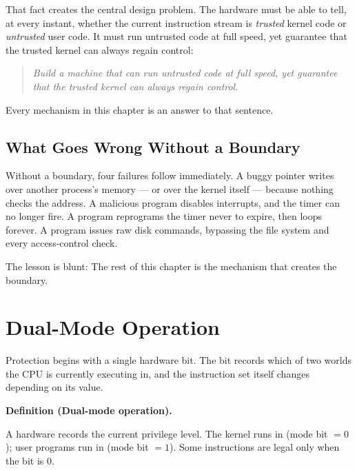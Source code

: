 \documentclass[11pt]{article}
\newenvironment{definitionbox}[1]{%
  \par\noindent\textbf{Definition (#1).}\ \itshape
}{\par\vspace{0.3em}}
\begin{document}
That fact creates the central design problem. The hardware must be able to
tell, at every instant, whether the current instruction stream is
\emph{trusted} kernel code or \emph{untrusted} user code. It must run untrusted
code at full speed, yet guarantee that the trusted kernel can always regain
control:

\begin{quote}
\itshape
Build a machine that can run untrusted code at full speed, yet guarantee that
the trusted kernel can always regain control.
\end{quote}

Every mechanism in this chapter is an answer to that sentence.

\subsection{What Goes Wrong Without a Boundary}

Without a boundary, four failures follow immediately. A buggy pointer writes
over another process's memory --- or over the kernel itself --- because nothing
checks the address. A malicious program disables interrupts, and the timer can
no longer fire. A program reprograms the timer never to expire, then loops
forever. A program issues raw disk commands, bypassing the file system and
every access-control check.

The lesson is blunt:  The rest of this chapter is the mechanism that creates the boundary.

\section{Dual-Mode Operation}
\noindent{}

Protection begins with a single hardware bit. The bit records which of two
worlds the CPU is currently executing in, and the instruction set itself
changes depending on its value.

\begin{definitionbox}{Dual-mode operation}
A hardware  records the current privilege level. The kernel runs
in  (mode bit $=0$); user programs run in 
(mode bit $=1$). Some instructions are legal only when the bit is $0$.
\end{definitionbox}
\end{document}
